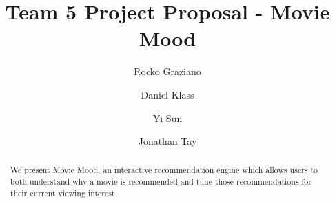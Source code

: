 \documentclass[sigchi, 12pt, nonacm=true, timestamp=true, screen=true]{acmart}
\begin{document}
\title{Team 5 Project Proposal - Movie Mood}


\author{Rocko Graziano}
\author{Daniel Klass}
\author{Yi Sun}
\author{Jonathan Tay}



\begin{abstract}
We present Movie Mood, an interactive recommendation engine which allows users to both understand why a movie is recommended and tune those recommendations for their current viewing interest.
\end{abstract}

\end{document}
